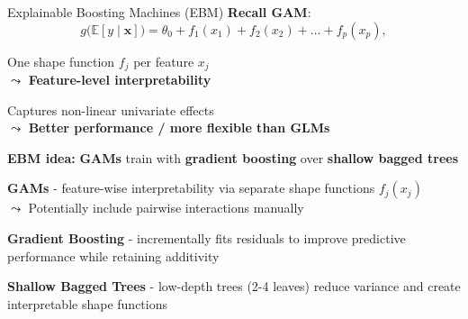 \documentclass[10pt,compress,t,notes=noshow, xcolor=table]{beamer}
\begin{document}
\begin{framev}[align=top]{Explainable Boosting Machines (EBM)}
\textbf{Recall GAM}: 
$$
g\big(\mathbb{E}[y \mid \mathbf{x}]\big) = \theta_0 + f_1(x_{1}) + f_2(x_{2}) + \ldots + f_p(x_{p}),
$$
\begin{itemizeM}
\item One shape function $f_j$ per feature $x_j$\\
$\leadsto$ \textbf{Feature-level interpretability}
\item Captures non-linear univariate effects\\
$\leadsto$ \textbf{Better performance / more flexible than GLMs}
\end{itemizeM}
\spacer[0.25]

\textbf{EBM idea:} \textbf{GAMs} train with \textbf{gradient boosting} over \textbf{shallow bagged trees}
\begin{itemizeM}
\item \textbf{GAMs} - feature-wise interpretability via separate shape functions $f_j(x_j)$\\
$\leadsto$ Potentially include pairwise interactions manually
\item \textbf{Gradient Boosting} - incrementally fits residuals to improve predictive performance while retaining additivity
\item \textbf{Shallow Bagged Trees} - low-depth trees (2-4 leaves) reduce variance and create interpretable shape functions
\end{itemizeM}



\end{framev}
\end{document}
